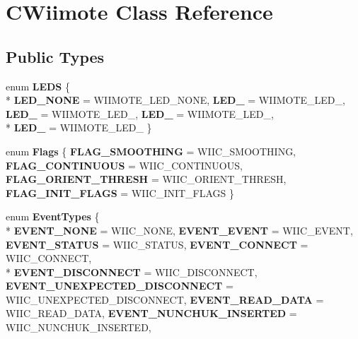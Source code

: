 \hypertarget{class_c_wiimote}{\section{C\-Wiimote Class Reference}
\label{class_c_wiimote}
}
\subsection*{Public Types}
\begin{DoxyCompactItemize}
\item 
enum {\bfseries L\-E\-D\-S} \{ \\*
{\bfseries L\-E\-D\-\_\-\-N\-O\-N\-E} =  W\-I\-I\-M\-O\-T\-E\-\_\-\-L\-E\-D\-\_\-\-N\-O\-N\-E, 
{\bfseries L\-E\-D\-\_} =  W\-I\-I\-M\-O\-T\-E\-\_\-\-L\-E\-D\-\_, 
{\bfseries L\-E\-D\-\_} =  W\-I\-I\-M\-O\-T\-E\-\_\-\-L\-E\-D\-\_, 
{\bfseries L\-E\-D\-\_} =  W\-I\-I\-M\-O\-T\-E\-\_\-\-L\-E\-D\-\_, 
\\*
{\bfseries L\-E\-D\-\_} =  W\-I\-I\-M\-O\-T\-E\-\_\-\-L\-E\-D\-\_
 \}
\item 
enum {\bfseries Flags} \{ {\bfseries F\-L\-A\-G\-\_\-\-S\-M\-O\-O\-T\-H\-I\-N\-G} =  W\-I\-I\-C\-\_\-\-S\-M\-O\-O\-T\-H\-I\-N\-G, 
{\bfseries F\-L\-A\-G\-\_\-\-C\-O\-N\-T\-I\-N\-U\-O\-U\-S} =  W\-I\-I\-C\-\_\-\-C\-O\-N\-T\-I\-N\-U\-O\-U\-S, 
{\bfseries F\-L\-A\-G\-\_\-\-O\-R\-I\-E\-N\-T\-\_\-\-T\-H\-R\-E\-S\-H} =  W\-I\-I\-C\-\_\-\-O\-R\-I\-E\-N\-T\-\_\-\-T\-H\-R\-E\-S\-H, 
{\bfseries F\-L\-A\-G\-\_\-\-I\-N\-I\-T\-\_\-\-F\-L\-A\-G\-S} =  W\-I\-I\-C\-\_\-\-I\-N\-I\-T\-\_\-\-F\-L\-A\-G\-S
 \}
\item 
enum {\bfseries Event\-Types} \{ \\*
{\bfseries E\-V\-E\-N\-T\-\_\-\-N\-O\-N\-E} =  W\-I\-I\-C\-\_\-\-N\-O\-N\-E, 
{\bfseries E\-V\-E\-N\-T\-\_\-\-E\-V\-E\-N\-T} =  W\-I\-I\-C\-\_\-\-E\-V\-E\-N\-T, 
{\bfseries E\-V\-E\-N\-T\-\_\-\-S\-T\-A\-T\-U\-S} =  W\-I\-I\-C\-\_\-\-S\-T\-A\-T\-U\-S, 
{\bfseries E\-V\-E\-N\-T\-\_\-\-C\-O\-N\-N\-E\-C\-T} =  W\-I\-I\-C\-\_\-\-C\-O\-N\-N\-E\-C\-T, 
\\*
{\bfseries E\-V\-E\-N\-T\-\_\-\-D\-I\-S\-C\-O\-N\-N\-E\-C\-T} =  W\-I\-I\-C\-\_\-\-D\-I\-S\-C\-O\-N\-N\-E\-C\-T, 
{\bfseries E\-V\-E\-N\-T\-\_\-\-U\-N\-E\-X\-P\-E\-C\-T\-E\-D\-\_\-\-D\-I\-S\-C\-O\-N\-N\-E\-C\-T} =  W\-I\-I\-C\-\_\-\-U\-N\-E\-X\-P\-E\-C\-T\-E\-D\-\_\-\-D\-I\-S\-C\-O\-N\-N\-E\-C\-T, 
{\bfseries E\-V\-E\-N\-T\-\_\-\-R\-E\-A\-D\-\_\-\-D\-A\-T\-A} =  W\-I\-I\-C\-\_\-\-R\-E\-A\-D\-\_\-\-D\-A\-T\-A, 
{\bfseries E\-V\-E\-N\-T\-\_\-\-N\-U\-N\-C\-H\-U\-K\-\_\-\-I\-N\-S\-E\-R\-T\-E\-D} =  W\-I\-I\-C\-\_\-\-N\-U\-N\-C\-H\-U\-K\-\_\-\-I\-N\-S\-E\-R\-T\-E\-D, 

\end{DoxyCompactItemize}
